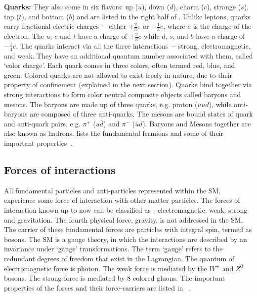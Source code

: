 {\bf Quarks:} They also come in six flavors: up ($u$), down ($d$), charm ($c$), strange ($s$), top ($t$), and bottom ($b$) and are listed in
the right half of \tab{\ref{Table:SMparticles}}. Unlike leptons, quarks carry fractional electric charges $-$ either $+\frac{2}{3}e$ or 
$-\frac{1}{3}e$, where $e$ is the charge of the electron. The $u$, $c$ and $t$ have a charge of $+\frac{2}{3}e$ while $d$, $s$, and $b$ have
a charge of $-\frac{1}{3}e$. The quarks interact via all the three interactions $-$ strong, electromagnetic, and weak. They have an additional
quantum number associated with them, called `color charge'. Each quark comes in three colors, often termed red, blue, and green. Colored quarks 
are not allowed to exist freely in nature, due to their property of confinement (explained in the next section). Quarks bind together via strong 
interactions to form color neutral composite objects called baryons and mesons. The baryons are made up of three quarks, e.g. proton ($uud$), 
while anti-baryons are composed of three anti-quarks. The mesons are bound states of quark and anti-quark pairs, e.g. $\pi^{+}$ ($u\bar{d}$) and 
$\pi^{-}$ ($\bar{u}d$). Baryons and Mesons together are also known as hadrons. \tab{\ref{Table:SMparticles}} lists the fundamental fermions and 
some of their important properties~\cite{Agashe:2014kda}. 


\subsection{Forces of interactions} 
All fundamental particles and anti-particles represented within the SM, experience some force of interaction with other matter 
particles. The forces of interaction known up to now can be classified as - electromagnetic, weak, strong and gravitation. The fourth 
physical force, gravity, is not addressed in the SM. The carrier of these fundamental forces are particles with integral spin, termed as bosons.
The SM is a gauge theory, in which the interactions are described by an invariance under `gauge' transformations. The term `gauge' refers
to the redundant degrees of freedom that exist in the Lagrangian. The quantum of electromagnetic force is photon. The weak force is mediated by 
the $W^{\pm}$ and $Z^{0}$ bosons. The strong force is mediated by 8 colored gluons. The important properties of the forces and their force-carriers 
are listed in \tab{\ref{Table:SMforces}}~\cite{Agashe:2014kda}. 


